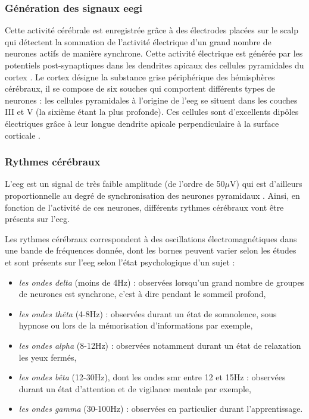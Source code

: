 \subsubsection{Génération des signaux \gls{eegi}}

Cette activité cérébrale est enregistrée grâce à des électrodes placées sur le scalp qui détectent la sommation de l'activité électrique d'un grand nombre de neurones actifs de manière synchrone.
Cette activité électrique est générée par les potentiels post-synaptiques dans les dendrites apicaux des cellules pyramidales du cortex \citep{Hallez2007}. Le cortex désigne 
la substance grise périphérique des hémisphères cérébraux, il se compose de six souches qui comportent différents types de neurones : les cellules pyramidales à l'origine de l'\gls{eeg} 
se situent dans les couches III et V (la sixième étant la plus profonde). Ces cellules sont d'excellents dipôles électriques grâce à leur longue dendrite apicale perpendiculaire 
à la surface corticale \citep{Bekkers2011}. 

\subsubsection{Rythmes cérébraux}

L'\gls{eeg} est un signal de très faible amplitude (de l'ordre de 50$\mu$V) qui est d'ailleurs proportionnelle au degré de synchronisation des neurones pyramidaux \citep{Hallez2007}. 
Ainsi, en fonction de l'activité de ces neurones, différents rythmes cérébraux vont être présents sur l'\gls{eeg}. 

Les rythmes cérébraux correspondent à des oscillations électromagnétiques dans une bande de fréquences donnée, dont les bornes peuvent varier selon les études et sont présents sur l'\gls{eeg}
selon l'état psychologique d'un sujet \citep{Marzbani2016} :  
\begin{itemize}
\item \emph{les ondes delta} (moins de 4Hz) : observées lorsqu'un grand nombre de groupes de neurones est synchrone, c'est à dire pendant le sommeil profond,
\item \emph{les ondes thêta} (4-8Hz) : observées durant un état de somnolence, sous hypnose ou lors de la mémorisation d'informations par exemple,
\item \emph{les ondes alpha} (8-12Hz) : observées notamment durant un état de relaxation les yeux fermés,
\item \emph{les ondes bêta} (12-30Hz), dont les ondes \gls{smr} entre 12 et 15Hz : observées durant un état d'attention et de vigilance mentale par exemple,
\item \emph{les ondes gamma} (30-100Hz) : observées en particulier durant l'apprentissage.
\end{itemize}

